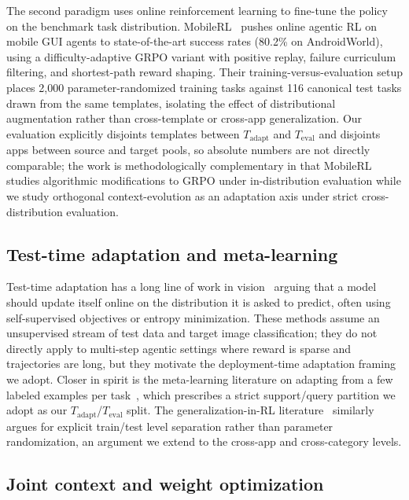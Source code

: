 The second paradigm uses online reinforcement learning to fine-tune the policy on the benchmark task distribution. MobileRL~\citep{mobilerl2025} pushes online agentic RL on mobile GUI agents to state-of-the-art success rates (80.2\% on AndroidWorld), using a difficulty-adaptive GRPO variant with positive replay, failure curriculum filtering, and shortest-path reward shaping. Their training-versus-evaluation setup places 2,000 parameter-randomized training tasks against 116 canonical test tasks drawn from the same templates, isolating the effect of distributional augmentation rather than cross-template or cross-app generalization. Our evaluation explicitly disjoints templates between $T_{\text{adapt}}$ and $T_{\text{eval}}$ and disjoints apps between source and target pools, so absolute numbers are not directly comparable; the work is methodologically complementary in that MobileRL studies algorithmic modifications to GRPO under in-distribution evaluation while we study orthogonal context-evolution as an adaptation axis under strict cross-distribution evaluation.

\subsection{Test-time adaptation and meta-learning}

Test-time adaptation has a long line of work in vision~\citep{sun2020ttt,wang2021tent} arguing that a model should update itself online on the distribution it is asked to predict, often using self-supervised objectives or entropy minimization. These methods assume an unsupervised stream of test data and target image classification; they do not directly apply to multi-step agentic settings where reward is sparse and trajectories are long, but they motivate the deployment-time adaptation framing we adopt. Closer in spirit is the meta-learning literature on adapting from a few labeled examples per task~\citep{finn2017maml}, which prescribes a strict support/query partition we adopt as our $T_{\text{adapt}}$/$T_{\text{eval}}$ split. The generalization-in-RL literature~\citep{cobbe2020procgen} similarly argues for explicit train/test level separation rather than parameter randomization, an argument we extend to the cross-app and cross-category levels.

\subsection{Joint context and weight optimization}

